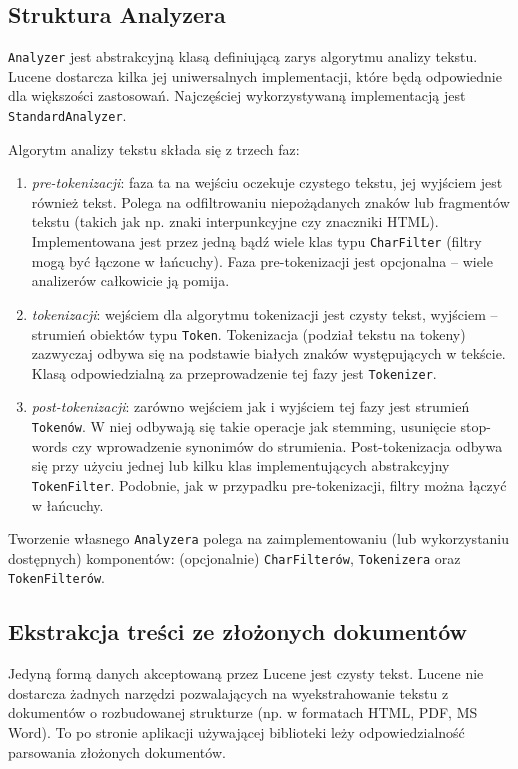 \subsection{Struktura Analyzera}

\texttt{Analyzer} jest abstrakcyjną klasą definiującą zarys algorytmu analizy tekstu. Lucene dostarcza kilka jej uniwersalnych implementacji, które będą odpowiednie dla większości zastosowań. Najczęściej wykorzystywaną implementacją jest \texttt{StandardAnalyzer}.

Algorytm analizy tekstu składa się z trzech faz:
\begin{enumerate}
 \item \emph{pre-tokenizacji}: faza ta na wejściu oczekuje czystego tekstu, jej wyjściem jest również tekst. Polega na odfiltrowaniu niepożądanych znaków lub fragmentów tekstu (takich jak np. znaki interpunkcyjne czy znaczniki HTML). Implementowana jest przez jedną bądź wiele klas typu \texttt{CharFilter} (filtry mogą być łączone w łańcuchy). Faza pre-tokenizacji jest opcjonalna -- wiele analizerów całkowicie ją pomija.
 \item \emph{tokenizacji}: wejściem dla algorytmu tokenizacji jest czysty tekst, wyjściem -- strumień obiektów typu \texttt{Token}. Tokenizacja (podział tekstu na tokeny) zazwyczaj odbywa się na podstawie białych znaków występujących w tekście. Klasą odpowiedzialną za przeprowadzenie tej fazy jest \texttt{Tokenizer}.
 \item \emph{post-tokenizacji}: zarówno wejściem jak i wyjściem tej fazy jest strumień \texttt{Tokenów}. W niej odbywają się takie operacje jak stemming, usunięcie stop-words czy wprowadzenie synonimów do strumienia. Post-tokenizacja odbywa się przy użyciu  jednej lub kilku klas implementujących abstrakcyjny \texttt{TokenFilter}. Podobnie, jak w przypadku pre-tokenizacji, filtry można łączyć w łańcuchy.
\end{enumerate}

Tworzenie własnego \texttt{Analyzera} polega na zaimplementowaniu (lub wykorzystaniu dostępnych) komponentów: (opcjonalnie) \texttt{CharFilterów}, \texttt{Tokenizera} oraz \texttt{TokenFilterów}. 

\subsection{Ekstrakcja treści ze złożonych dokumentów}

Jedyną formą danych akceptowaną przez Lucene jest czysty tekst. Lucene nie dostarcza żadnych narzędzi pozwalających na wyekstrahowanie tekstu z dokumentów o rozbudowanej strukturze (np. w formatach HTML, PDF, MS Word). To po stronie aplikacji używającej biblioteki leży odpowiedzialność parsowania złożonych dokumentów. 

